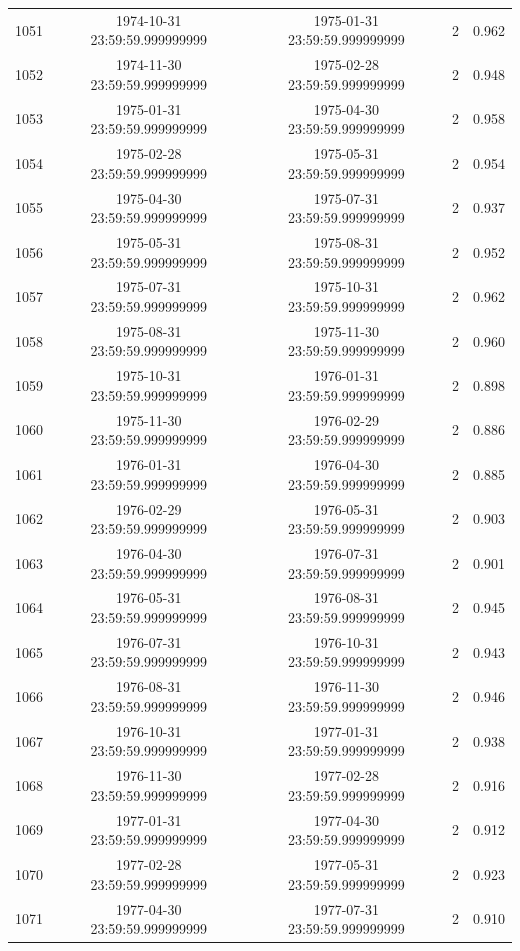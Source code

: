 \begin{table}
\begin{tabular}{lcccc}
1051 & 1974-10-31 23:59:59.999999999 & 1975-01-31 23:59:59.999999999 & 2 & 0.962 \\
1052 & 1974-11-30 23:59:59.999999999 & 1975-02-28 23:59:59.999999999 & 2 & 0.948 \\
1053 & 1975-01-31 23:59:59.999999999 & 1975-04-30 23:59:59.999999999 & 2 & 0.958 \\
1054 & 1975-02-28 23:59:59.999999999 & 1975-05-31 23:59:59.999999999 & 2 & 0.954 \\
1055 & 1975-04-30 23:59:59.999999999 & 1975-07-31 23:59:59.999999999 & 2 & 0.937 \\
1056 & 1975-05-31 23:59:59.999999999 & 1975-08-31 23:59:59.999999999 & 2 & 0.952 \\
1057 & 1975-07-31 23:59:59.999999999 & 1975-10-31 23:59:59.999999999 & 2 & 0.962 \\
1058 & 1975-08-31 23:59:59.999999999 & 1975-11-30 23:59:59.999999999 & 2 & 0.960 \\
1059 & 1975-10-31 23:59:59.999999999 & 1976-01-31 23:59:59.999999999 & 2 & 0.898 \\
1060 & 1975-11-30 23:59:59.999999999 & 1976-02-29 23:59:59.999999999 & 2 & 0.886 \\
1061 & 1976-01-31 23:59:59.999999999 & 1976-04-30 23:59:59.999999999 & 2 & 0.885 \\
1062 & 1976-02-29 23:59:59.999999999 & 1976-05-31 23:59:59.999999999 & 2 & 0.903 \\
1063 & 1976-04-30 23:59:59.999999999 & 1976-07-31 23:59:59.999999999 & 2 & 0.901 \\
1064 & 1976-05-31 23:59:59.999999999 & 1976-08-31 23:59:59.999999999 & 2 & 0.945 \\
1065 & 1976-07-31 23:59:59.999999999 & 1976-10-31 23:59:59.999999999 & 2 & 0.943 \\
1066 & 1976-08-31 23:59:59.999999999 & 1976-11-30 23:59:59.999999999 & 2 & 0.946 \\
1067 & 1976-10-31 23:59:59.999999999 & 1977-01-31 23:59:59.999999999 & 2 & 0.938 \\
1068 & 1976-11-30 23:59:59.999999999 & 1977-02-28 23:59:59.999999999 & 2 & 0.916 \\
1069 & 1977-01-31 23:59:59.999999999 & 1977-04-30 23:59:59.999999999 & 2 & 0.912 \\
1070 & 1977-02-28 23:59:59.999999999 & 1977-05-31 23:59:59.999999999 & 2 & 0.923 \\
1071 & 1977-04-30 23:59:59.999999999 & 1977-07-31 23:59:59.999999999 & 2 & 0.910 \\

\end{tabular}
\end{table}
